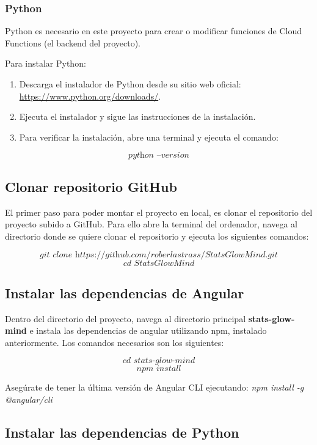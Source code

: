 \subsubsection{Python}
Python es necesario en este proyecto para crear o modificar funciones de Cloud Functions (el backend del proyecto).

Para instalar Python:
\begin{enumerate}
    \item Descarga el instalador de Python desde su sitio web oficial: \url{https://www.python.org/downloads/}.
    \item Ejecuta el instalador y sigue las instrucciones de la instalación.
    \item Para verificar la instalación, abre una terminal y ejecuta el comando:
\end{enumerate}
$$ \textit{python --version} $$


\subsection{Clonar repositorio GitHub}

El primer paso para poder montar el proyecto en local, es clonar el repositorio del proyecto subido a GitHub. Para ello abre la terminal del ordenador, navega al directorio donde se quiere clonar el repositorio y ejecuta los siguientes comandos:

$$ \textit{git clone https://github.com/roberlastrass/StatsGlowMind.git} $$
$$ \textit{cd StatsGlowMind} $$

\subsection{Instalar las dependencias de Angular}

Dentro del directorio del proyecto, navega al directorio principal \textbf{stats-glow-mind} e instala las dependencias de angular utilizando npm, instalado anteriormente. Los comandos necesarios son los siguientes:

$$ \textit{cd stats-glow-mind} $$
$$ \textit{npm install} $$

Asegúrate de tener la última versión de Angular CLI ejecutando: \textit{npm install -g @angular/cli}

\subsection{Instalar las dependencias de Python}

